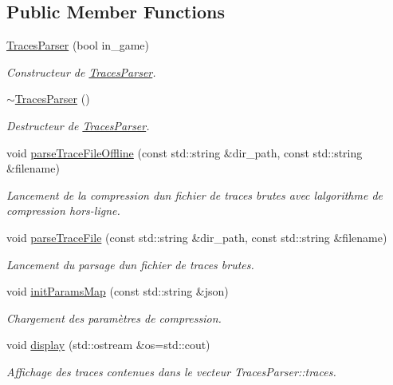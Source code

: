 \subsection*{Public Member Functions}
\begin{DoxyCompactItemize}
\item 
\hyperlink{class_traces_parser_ab7218dcf00853f4bcef39d0638fad455}{Traces\+Parser} (bool in\+\_\+game)
\begin{DoxyCompactList}\small\item\em Constructeur de \hyperlink{class_traces_parser}{Traces\+Parser}. \end{DoxyCompactList}\item 
\hyperlink{class_traces_parser_aacb694406ed5ff3f0124bd8c38626e73}{$\sim$\+Traces\+Parser} ()
\begin{DoxyCompactList}\small\item\em Destructeur de \hyperlink{class_traces_parser}{Traces\+Parser}. \end{DoxyCompactList}\item 
void \hyperlink{class_traces_parser_af6d608ef964c68501657e0087b428e78}{parse\+Trace\+File\+Offline} (const std\+::string \&dir\+\_\+path, const std\+::string \&filename)
\begin{DoxyCompactList}\small\item\em Lancement de la compression d\textquotesingle{}un fichier de traces brutes avec l\textquotesingle{}algorithme de compression hors-\/ligne. \end{DoxyCompactList}\item 
void \hyperlink{class_traces_parser_ae38980b29e0c70e2df3f6685a4fc5eb4}{parse\+Trace\+File} (const std\+::string \&dir\+\_\+path, const std\+::string \&filename)
\begin{DoxyCompactList}\small\item\em Lancement du parsage d\textquotesingle{}un fichier de traces brutes. \end{DoxyCompactList}\item 
void \hyperlink{class_traces_parser_a6cbaf502b65284074b79ed10ff462f5d}{init\+Params\+Map} (const std\+::string \&json)
\begin{DoxyCompactList}\small\item\em Chargement des paramètres de compression. \end{DoxyCompactList}\item 
void \hyperlink{class_traces_parser_a7ccd84d89ea60faf074c852b0d7b2b85}{display} (std\+::ostream \&os=std\+::cout)
\begin{DoxyCompactList}\small\item\em Affichage des traces contenues dans le vecteur Traces\+Parser\+::traces. \end{DoxyCompactList}\item 

\end{DoxyCompactItemize}
